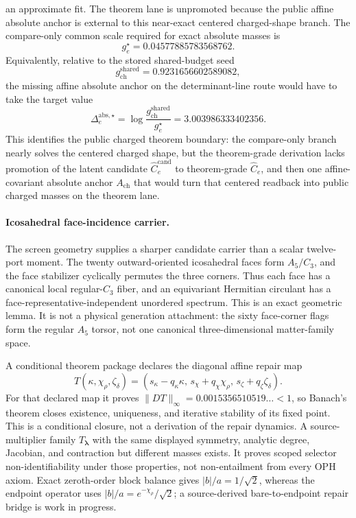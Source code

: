 \documentclass[11pt]{article}
\begin{document}
an approximate fit. The theorem lane is unpromoted because the public affine absolute anchor is external
to this near-exact centered charged-shape branch. The compare-only common scale
required for exact absolute masses is
\[
g_e^\star = 0.04577885783568762.
\]
Equivalently, relative to the stored shared-budget seed
\[
g_{\mathrm{ch}}^{\mathrm{shared}} = 0.9231656602589082,
\]
the missing affine absolute anchor on the determinant-line route would have to take the target value
\[
\Delta_e^{\mathrm{abs},\star}
=
\log\!\frac{g_{\mathrm{ch}}^{\mathrm{shared}}}{g_e^\star}
=
3.003986333402356.
\]
This identifies the public charged theorem boundary: the compare-only branch nearly solves
the centered charged shape, but the theorem-grade derivation lacks promotion of the latent
candidate \(\widehat C_e^{\mathrm{cand}}\) to theorem-grade \(\widehat C_e\), and then one
affine-covariant absolute anchor \(A_{\mathrm{ch}}\) that would turn that centered readback into
public charged masses on the theorem lane.

\paragraph{Icosahedral face-incidence carrier.}
The screen geometry supplies a sharper candidate carrier than a scalar
twelve-port moment.  The twenty outward-oriented icosahedral faces form
\(A_5/C_3\), and the face stabilizer cyclically permutes the three corners.
Thus each face has a canonical local regular-\(C_3\) fiber, and an equivariant
Hermitian circulant has a face-representative-independent unordered spectrum.
This is an exact geometric lemma.  It is not a physical generation
attachment: the sixty face-corner flags form the regular \(A_5\) torsor, not
one canonical three-dimensional matter-family space.

A conditional theorem package declares the diagonal affine repair map
\[
T(\kappa,\chi_\rho,\zeta_\delta)
=
(s_\kappa-q_\kappa\kappa,\,
  s_\chi+q_\chi\chi_\rho,\,
  s_\zeta+q_\zeta\zeta_\delta).
\]
For that declared map it proves
\(\lVert DT\rVert_\infty=0.0015356510519\ldots<1\), so Banach's theorem closes
existence, uniqueness, and iterative stability of its fixed point.  This is a
conditional closure, not a derivation of the repair dynamics.  A
source-multiplier family \(T_{\boldsymbol\lambda}\) with the
same displayed symmetry, analytic degree, Jacobian, and contraction but
different masses exists.  It proves scoped selector non-identifiability
under those properties, not non-entailment from every OPH axiom.  Exact
zeroth-order block balance gives
\(|b|/a=1/\sqrt2\), whereas the endpoint operator uses
\(|b|/a=e^{-\chi_\rho}/\sqrt2\); a source-derived bare-to-endpoint repair bridge
is work in progress.
\end{document}
